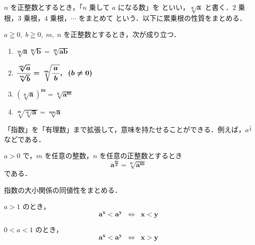 \documentclass[b5paper,uplatex,dvipdfmx,fleqn]{jsarticle}
\theoremstyle{definition}
\begin{document}
\newpage
\noindent
{}\vspace{0.2cm}

$n$ を正整数とするとき，「$n$ 乗して $a$ になる数」を  といい，$\boldsymbol{\sqrt[n]{a}}$ と書く．$2$ 乗根，$3$ 乗根，$4$ 乗根，$\cdots$ をまとめて  という．以下に累乗根の性質をまとめる．\vspace{0.2cm}

\begin{tcolorbox}[title=\textgt{累乗根の性質},sharp corners]
$a \geqq 0,\; b \geqq 0,\; m,\; n$ を正整数とするとき，次が成り立つ．
\begin{enumerate}
\item
$\displaystyle \boldsymbol{\sqrt[m]{a}\sqrt[m]{b} = \sqrt[m]{ab}}$\vspace{0.2cm}
\item
$\displaystyle \boldsymbol{\frac{\sqrt[m]{a}}{\sqrt[m]{b}} = \sqrt[m]{\mathstrut \frac{\,a\,}{b}},\;\; (b \neq 0)}$\vspace{0.2cm}
\item
$\boldsymbol{(\sqrt[n]{a})^{m} = \sqrt[n]{a^{m}}}$\vspace{0.2cm}
\item
$\boldsymbol{\sqrt[m]{\sqrt[n]{a}} = \sqrt[mn]{a}}$
\end{enumerate}
\end{tcolorbox}\vspace{0.2cm}

\noindent
{}\vspace{0.2cm}

「指数」を「有理数」まで拡張して，意味を持たせることができる．例えば，$a^{\frac{1}{3}}$ などである．

\begin{tcolorbox}[title=\textgt{分数（有理数）指数の定義},sharp corners]
$a >0$ で，$m$ を任意の整数，$n$ を任意の正整数とするとき
\[
\boldsymbol{a^{\frac{m}{n}} = \sqrt[n]{a^{m}}}
\]
である．
\end{tcolorbox}\vspace{0.2cm}

\noindent
{}\vspace{0.2cm}

指数の大小関係の同値性をまとめる．

$a > 1$ のとき，
\[
\boldsymbol{a^{x} < a^{y}\;\; \Leftrightarrow\;\; x < y}
\]

$0 < a < 1$ のとき，
\[
\boldsymbol{a^{x} < a^{y}\;\; \Leftrightarrow\;\; x > y}
\]
\end{document}

